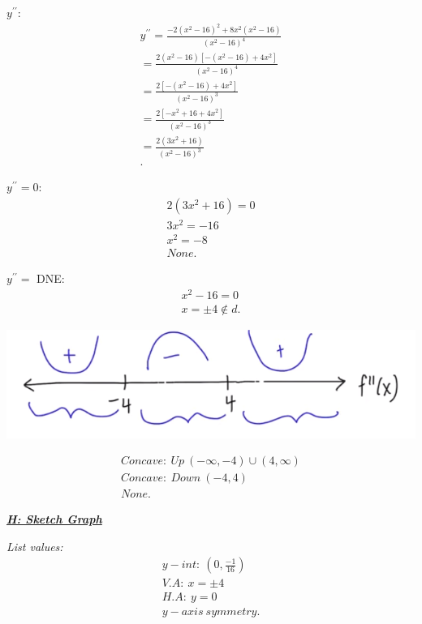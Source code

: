 \documentclass{report}
\begin{document}
  \bigbreak \noindent 
  \textit{$y^{\prime\prime}$}:
  \begin{align*}
    y^{\prime\prime} = \frac{-2(x^{2}-16)^{2}+8x^{2}(x^{2}-16)}{(x^{2}-16)^{4}} \\
    = \frac{2(x^{2}-16)[-(x^{2}-16)+4x^{2}]}{(x^{2}-16)^{4}} \\
    = \frac{2[-(x^{2}-16)+4x^{2}]}{(x^{2}-16)^{3}}  \\
    = \frac{2[-x^{2}+16+4x^{2}]}{(x^{2}-16)^{3}}  \\
    = \frac{2(3x^{2}+16)}{(x^{2}-16)^{3}}  \\
  .\end{align*}

  \bigbreak \noindent 
  \textit{$y^{\prime\prime} = 0$}:
  \begin{align*}
   2(3x^{2}+16) =0 \\
   3x^{2} = -16 \\
   x^{2} = -8 \\
   \boxed{None}
  .\end{align*}

  \bigbreak \noindent 
  \textit{$y^{\prime\prime} = $} DNE:
  \begin{align*}
    x^{2}-16 = 0 \\
    x = \pm 4 \notin d
  .\end{align*}

  \bigbreak \noindent 

  \bigbreak \noindent 
  \begin{center}
    \includegraphics[scale=0.7]{ ./images/19.png }
  \end{center}
  \begin{align*}
    Concave:\ Up\ (-\infty, -4) \cup (4,\infty) \\
    Concave:\ Down\ (-4,4) \\
    None
  .\end{align*}

  \pagebreak \bigbreak \noindent
  \textbf{\textit{\underline{H: Sketch Graph}}}

  \bigbreak \noindent 
  \textit{List values:}
  \begin{align*}
    y-int:\ (0, \frac{-1}{16}) \\
    V.A:\ x=\pm 4 \\
    H.A:\ y = 0 \\
    y-axis\ symmetry
  .\end{align*}
\end{document}

